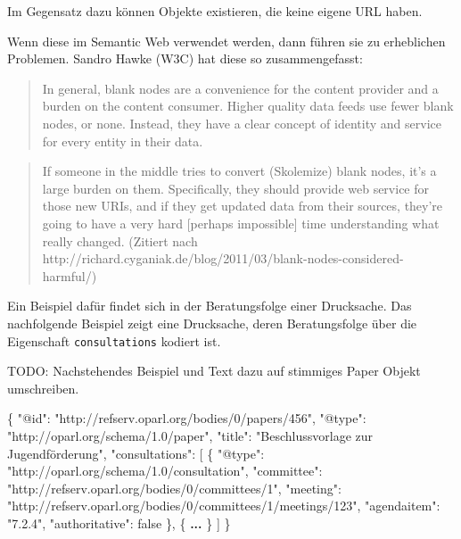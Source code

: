 \documentclass[,a4paper]{article}
\newenvironment{Shaded}{}{}
\newcommand{\DataTypeTok}[1]{\textcolor[rgb]{0.56,0.13,0.00}{{#1}}}
\newcommand{\DecValTok}[1]{\textcolor[rgb]{0.25,0.63,0.44}{{#1}}}
\newcommand{\StringTok}[1]{\textcolor[rgb]{0.25,0.44,0.63}{{#1}}}
\newcommand{\ErrorTok}[1]{\textcolor[rgb]{1.00,0.00,0.00}{\textbf{{#1}}}}
\newcommand{\NormalTok}[1]{{#1}}
\begin{document}
Im Gegensatz dazu können Objekte existieren, die keine eigene URL haben.

Wenn diese im Semantic Web verwendet werden, dann führen sie zu
erheblichen Problemen. Sandro Hawke (W3C) hat diese so zusammengefasst:

\begin{quote}
In general, blank nodes are a convenience for the content provider and a
burden on the content consumer. Higher quality data feeds use fewer
blank nodes, or none. Instead, they have a clear concept of identity and
service for every entity in their data.
\end{quote}

\begin{quote}
If someone in the middle tries to convert (Skolemize) blank nodes, it's
a large burden on them. Specifically, they should provide web service
for those new URIs, and if they get updated data from their sources,
they're going to have a very hard {[}perhaps impossible{]} time
understanding what really changed. (Zitiert nach
http://richard.cyganiak.de/blog/2011/03/blank-nodes-considered-harmful/)
\end{quote}

Ein Beispiel dafür findet sich in der Beratungsfolge einer Drucksache.
Das nachfolgende Beispiel zeigt eine Drucksache, deren Beratungsfolge
über die Eigenschaft \texttt{consultations} kodiert ist.

TODO: Nachstehendes Beispiel und Text dazu auf stimmiges Paper Objekt
umschreiben.

\begin{Shaded}
\begin{Highlighting}[]
\NormalTok{\{}
    \DataTypeTok{"@id"}\NormalTok{: }\StringTok{"http://refserv.oparl.org/bodies/0/papers/456"}\NormalTok{,}
    \DataTypeTok{"@type"}\NormalTok{: }\StringTok{"http://oparl.org/schema/1.0/paper"}\NormalTok{,}
    \DataTypeTok{"title"}\NormalTok{: }\StringTok{"Beschlussvorlage zur Jugendförderung"}\NormalTok{,}
    \DataTypeTok{"consultations"}\NormalTok{: [}
        \NormalTok{\{}
            \DataTypeTok{"@type"}\NormalTok{: }\StringTok{"http://oparl.org/schema/1.0/consultation"}\NormalTok{,}
            \DataTypeTok{"committee"}\NormalTok{: }\StringTok{"http://refserv.oparl.org/bodies/0/committees/1"}\NormalTok{,}
            \DataTypeTok{"meeting"}\NormalTok{: }\StringTok{"http://refserv.oparl.org/bodies/0/committees/1/meetings/123"}\NormalTok{,}
            \DataTypeTok{"agendaitem"}\NormalTok{: }\StringTok{"7.2.4"}\NormalTok{,}
            \DataTypeTok{"authoritative"}\NormalTok{: }\DecValTok{false}
        \NormalTok{\},}
        \NormalTok{\{}
            \ErrorTok{...}
        \NormalTok{\}}
    \NormalTok{]}
\NormalTok{\}}
\end{Highlighting}
\end{Shaded}
\end{document}
